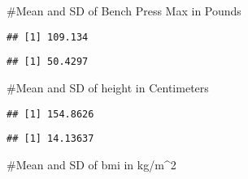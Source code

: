 \documentclass[
]{article}
\newenvironment{Shaded}{\begin{snugshade}}{\end{snugshade}}
\newcommand{\KeywordTok}[1]{\textcolor[rgb]{0.13,0.29,0.53}{\textbf{#1}}}
\newcommand{\NormalTok}[1]{#1}
\newcommand{\OperatorTok}[1]{\textcolor[rgb]{0.81,0.36,0.00}{\textbf{#1}}}
\begin{document}
\#Mean and SD of Bench Press Max in Pounds

\begin{Shaded}
\end{Shaded}

\begin{verbatim}
## [1] 109.134
\end{verbatim}

\begin{Shaded}
\end{Shaded}

\begin{verbatim}
## [1] 50.4297
\end{verbatim}

\#Mean and SD of height in Centimeters

\begin{Shaded}
\end{Shaded}

\begin{verbatim}
## [1] 154.8626
\end{verbatim}

\begin{Shaded}
\end{Shaded}

\begin{verbatim}
## [1] 14.13637
\end{verbatim}

\#Mean and SD of bmi in kg/m\^{}2

\begin{Shaded}
\end{Shaded}
\end{document}
